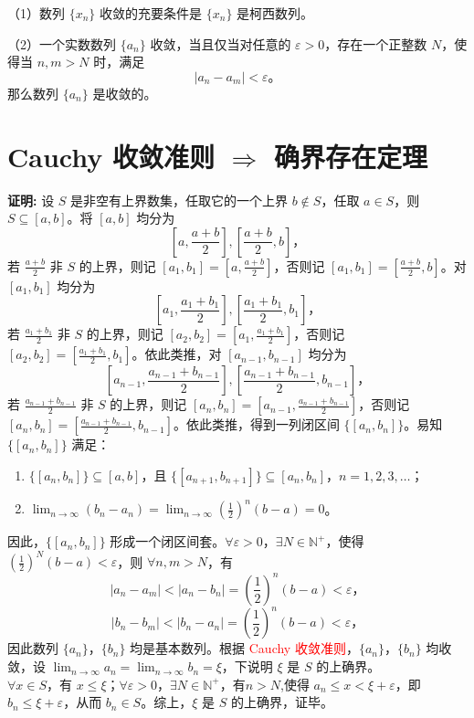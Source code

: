 \documentclass[lang=cn,newtx,10pt,scheme=chinese]{elegantbook}
\begin{document}
\begin{theorem} \label{pro:max3}
（1）数列 \(\{x_n\}\) 收敛的充要条件是 \(\{x_n\}\) 是柯西数列。

（2）一个实数数列 $\{a_n\}$ 收敛，当且仅当对任意的 $\varepsilon > 0$，存在一个正整数 $N$，使得当 $n, m > N$ 时，满足
\[
|a_n - a_m| < \varepsilon。
\]
那么数列 $\{a_n\}$ 是收敛的。
\end{theorem}

\section*{Cauchy 收敛准则 $\Rightarrow$ 确界存在定理}

\textbf{证明:} 设 $S$ 是非空有上界数集，任取它的一个上界 $b \notin S$，任取 $a \in S$，则 $S \subseteq [a, b]$。将 $[a, b]$ 均分为
\[
\left[ a, \frac{a + b}{2} \right], \left[ \frac{a + b}{2}, b \right]，
\]
若 $\frac{a + b}{2}$ 非 $S$ 的上界，则记 $[a_1, b_1] = \left[ a, \frac{a + b}{2} \right]$，否则记 $[a_1, b_1] = \left[ \frac{a + b}{2}, b \right]$。对 $[a_1, b_1]$ 均分为
\[
\left[ a_1, \frac{a_1 + b_1}{2} \right], \left[ \frac{a_1 + b_1}{2}, b_1 \right]，
\]
若 $\frac{a_1 + b_1}{2}$ 非 $S$ 的上界，则记 $[a_2, b_2] = \left[ a_1, \frac{a_1 + b_1}{2} \right]$，否则记 $[a_2, b_2] = \left[ \frac{a_1 + b_1}{2}, b_1 \right]$。依此类推，对 $[a_{n-1}, b_{n-1}]$ 均分为
\[
\left[ a_{n-1}, \frac{a_{n-1} + b_{n-1}}{2} \right], \left[ \frac{a_{n-1} + b_{n-1}}{2}, b_{n-1} \right]，
\]
若 $\frac{a_{n-1} + b_{n-1}}{2}$ 非 $S$ 的上界，则记 $[a_n, b_n] = \left[ a_{n-1}, \frac{a_{n-1} + b_{n-1}}{2} \right]$，否则记 $[a_n, b_n] = \left[ \frac{a_{n-1} + b_{n-1}}{2}, b_{n-1} \right]$。依此类推，得到一列闭区间 $\{[a_n, b_n]\}$。易知 $\{[a_n, b_n]\}$ 满足：
\begin{enumerate}
    \item $\{[a_n, b_n]\} \subseteq [a, b]$，且 $\{[a_{n+1}, b_{n+1}]\} \subseteq [a_n, b_n]$，$n = 1, 2, 3, \ldots$；
    \item $\lim_{n \to \infty} (b_n - a_n) = \lim_{n \to \infty} \left(\frac{1}{2}\right)^n (b - a) = 0$。
\end{enumerate}

因此，$\{[a_n, b_n]\}$ 形成一个闭区间套。$\forall \varepsilon > 0$，$\exists N \in \mathbb{N}^+$，使得 $\left(\frac{1}{2}\right)^N (b - a) < \varepsilon$，则 $\forall n, m > N$，有
\[
|a_n - a_m| < |a_n - b_n| = \left(\frac{1}{2}\right)^n (b - a) < \varepsilon，
\]
\[
|b_n - b_m| < |b_n - a_n| = \left(\frac{1}{2}\right)^n (b - a)  < \varepsilon，
\]
因此数列 $\{a_n\}$，$\{b_n\}$ 均是基本数列。根据 \textcolor{red}{Cauchy 收敛准则}，$\{a_n\}$，$\{b_n\}$ 均收敛，设 $\lim_{n \to \infty} a_n = \lim_{n \to \infty} b_n = \xi$，下说明 $\xi$ 是 $S$ 的上确界。\\
$\forall x \in S$，有 $x \leq \xi$；$\forall \varepsilon > 0$，$\exists N \in \mathbb{N}^+$，有$n> N$,使得 $a_n \leq x < \xi + \varepsilon$，即 $b_n \leq \xi + \varepsilon$，从而 $b_n \in S$。综上，$\xi$ 是 $S$ 的上确界，证毕。
\end{document}
